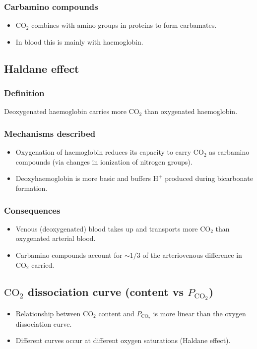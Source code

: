 \documentclass[11pt,a4paper]{article}
\begin{document}
\subsubsection{Carbamino compounds}
\begin{itemize}
  \item \(\mathrm{CO_2}\) combines with amino groups in proteins to form carbamates.
  \item In blood this is mainly with haemoglobin.
\end{itemize}

\subsection{Haldane effect}
\subsubsection{Definition}
Deoxygenated haemoglobin carries more \(\mathrm{CO_2}\) than oxygenated haemoglobin.

\subsubsection{Mechanisms described}
\begin{itemize}
  \item Oxygenation of haemoglobin reduces its capacity to carry \(\mathrm{CO_2}\) as carbamino compounds (via changes in ionization of nitrogen groups).
  \item Deoxyhaemoglobin is more basic and buffers \(\mathrm{H^+}\) produced during bicarbonate formation.
\end{itemize}

\subsubsection{Consequences}
\begin{itemize}
  \item Venous (deoxygenated) blood takes up and transports more \(\mathrm{CO_2}\) than oxygenated arterial blood.
  \item Carbamino compounds account for \(\sim 1/3\) of the arteriovenous difference in \(\mathrm{CO_2}\) carried.
\end{itemize}

\subsection{\(\mathrm{CO_2}\) dissociation curve (content vs \(P_{\mathrm{CO_2}}\))}
\begin{itemize}
  \item Relationship between \(\mathrm{CO_2}\) content and \(P_{\mathrm{CO_2}}\) is more linear than the oxygen dissociation curve.
  \item Different curves occur at different oxygen saturations (Haldane effect).
\end{itemize}
\end{document}
